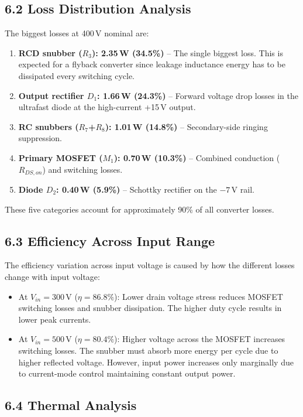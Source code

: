 \subsection*{6.2 Loss Distribution Analysis}

The biggest losses at 400\,V nominal are:
\begin{enumerate}
    \item \textbf{RCD snubber ($R_3$): 2.35\,W (34.5\%)} -- The single biggest loss. This is expected for a flyback converter since leakage inductance energy has to be dissipated every switching cycle.
    \item \textbf{Output rectifier $D_1$: 1.66\,W (24.3\%)} -- Forward voltage drop losses in the ultrafast diode at the high-current +15\,V output.
    \item \textbf{RC snubbers ($R_7$+$R_8$): 1.01\,W (14.8\%)} -- Secondary-side ringing suppression.
    \item \textbf{Primary MOSFET ($M_1$): 0.70\,W (10.3\%)} -- Combined conduction ($R_{DS,on}$) and switching losses.
    \item \textbf{Diode $D_2$: 0.40\,W (5.9\%)} -- Schottky rectifier on the $-7$\,V rail.
\end{enumerate}

These five categories account for approximately 90\% of all converter losses.

\subsection*{6.3 Efficiency Across Input Range}

The efficiency variation across input voltage is caused by how the different losses change with input voltage:
\begin{itemize}
    \item At $V_{in} = 300$\,V ($\eta = 86.8\%$): Lower drain voltage stress reduces MOSFET switching losses and snubber dissipation. The higher duty cycle results in lower peak currents.
    \item At $V_{in} = 500$\,V ($\eta = 80.4\%$): Higher voltage across the MOSFET increases switching losses. The snubber must absorb more energy per cycle due to higher reflected voltage. However, input power increases only marginally due to current-mode control maintaining constant output power.
\end{itemize}

\subsection*{6.4 Thermal Analysis}

